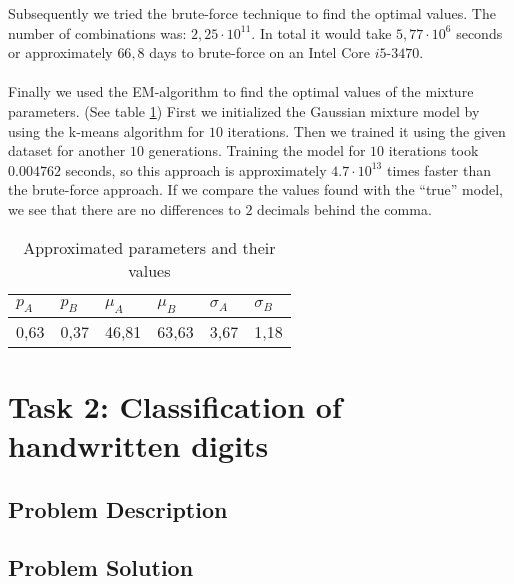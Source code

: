 \documentclass{article}
\begin{document}
Subsequently we tried the brute-force technique to find the optimal values. The number of combinations was: $2,25 \cdot 10^{11}$. In total it would take $5,77 \cdot 10^6$ seconds or approximately $66,8$ days to brute-force on an Intel Core $i5$-$3470$.\\\\

Finally we used the EM-algorithm to find the optimal values of the mixture parameters. (See table \ref{table:data3}) First we initialized the Gaussian mixture model by using the k-means algorithm for $10$ iterations. Then we trained it using the given dataset for another $10$ generations. Training the model for $10$ iterations took  $0.004762$ seconds, so this approach is approximately $4.7 \cdot 10^{13}$ times faster than the brute-force approach. If we compare the values found with the ``true'' model, we see that there are no differences to $2$ decimals behind the comma. 

\begin{table}[!h]
	\begin{center}
		\begin{tabular}{l|l|l|l|l|l}
			$p_A$ & $p_B$ & $\mu_A$ & $\mu_B$ & $\sigma_A$ & $\sigma_B$ \\
			\hline
			0,63 & 0,37 & 46,81 & 63,63 & 3,67 & 1,18 \\
		\end{tabular}
		\caption{Approximated parameters and their values}
		\label{table:data3}
	\end{center}
\end{table}


\section{Task 2: Classiﬁcation of handwritten digits}
\subsection{Problem Description}


\subsection{Problem Solution}
\end{document}
